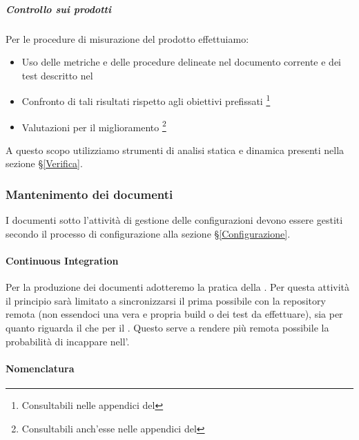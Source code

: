 			\subparagraph{Controllo sui prodotti}	\label{ControlloProdotti}
			Per le procedure di misurazione del prodotto effettuiamo:
			\begin{itemize}
				\item Uso delle metriche e delle procedure delineate nel documento corrente e dei test descritto nel \PdQd
				\item Confronto di tali risultati rispetto agli obiettivi prefissati \footnote{Consultabili nelle appendici del \PdQd}
				\item Valutazioni per il miglioramento \footnote{Consultabili anch'esse nelle appendici del \PdQd}
			\end{itemize}
			A questo scopo utilizziamo strumenti di analisi statica e dinamica presenti nella sezione \S\ref{Verifica}.


		\subsubsection{Mantenimento dei documenti}\label{Mantenimento}
		I documenti sotto l'attività di gestione delle configurazioni devono essere gestiti secondo il processo di configurazione alla sezione \S\ref{Configurazione}.

			\paragraph{Continuous Integration}\label{ContinuousIntegration}
			Per la produzione dei documenti adotteremo la pratica della .
			Per questa attività il principio sarà limitato a sincronizzarsi il prima possibile con la repository remota (non essendoci una vera e propria build o dei test da effettuare),
			sia per quanto riguarda il  che per il .
			Questo serve a rendere più remota possibile la probabilità di incappare nell'.

			\paragraph{Nomenclatura}

